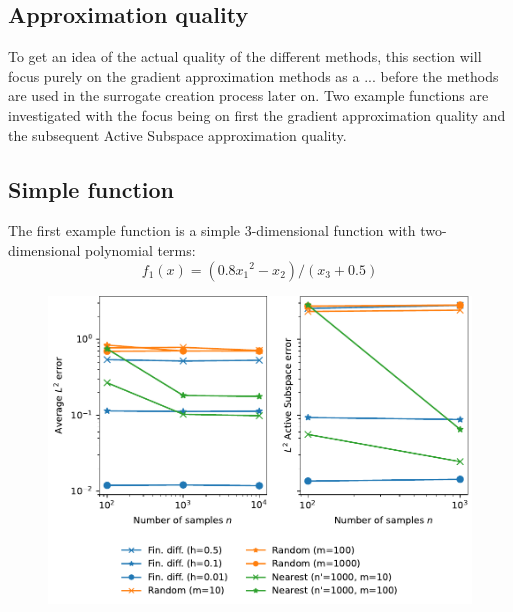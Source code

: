 \documentclass[
  a4paper,  %
  twoside,  %
  bibliography=totoc,
  headsepline,
  cleardoublepage=empty,
  parskip=half,
  draft=false
]{scrbook}
\begin{document}
\subsection{Approximation quality}

To get an idea of the actual quality of the different methods, this section will focus purely on the gradient approximation methods as a ... before the methods are used in the surrogate creation process later on.
Two example functions are investigated with the focus being on first the gradient approximation quality and the subsequent Active Subspace approximation quality.

\newpage

\subsection{Simple function}

The first example function is a simple $3$-dimensional function with two-dimensional polynomial terms:
\begin{equation}
f_1(x)=(0.8 {x_1}^2 - x_2) / (x_3 + 0.5)
\nonumber
\end{equation}



\begin{figure}[H]
\begin{center}
	\includegraphics[width=\textwidth]{graphics/as_errors_f1}
\end{center}
	\label{fig:as_errors_f1}
\end{figure}
\end{document}
